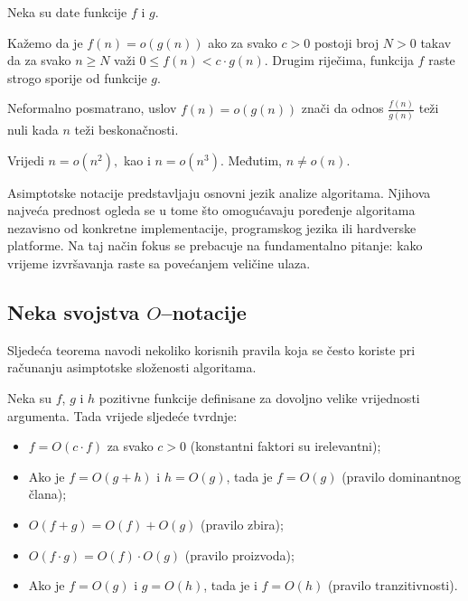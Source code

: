 \begin{definition}
	Neka su date funkcije $f$ i $g$.
	
	Kažemo da je $
	f(n)=o(g(n))$ ako za svako $c>0$ postoji broj $N>0$ takav da za svako $n\geq N$ važi $0\leq f(n)<c \cdot g(n).$ Drugim riječima, funkcija $f$ raste strogo sporije od funkcije $g$.
\end{definition}

Neformalno posmatrano, uslov $f(n)=o(g(n))
$ znači da odnos $
\frac{f(n)}{g(n)} $ teži nuli kada $n$ teži beskonačnosti.

\begin{example}
	Vrijedi $
	n=o(n^2),
	$ kao i 	$
	n=o(n^3).
	$ 	Međutim, 	$
	n\neq o(n).
	$
\end{example}

Asimptotske notacije predstavljaju osnovni jezik analize algoritama. Njihova najveća prednost ogleda se u tome što omogućavaju poređenje algoritama nezavisno od konkretne implementacije, programskog jezika ili hardverske platforme. Na taj način fokus se prebacuje na fundamentalno pitanje: kako vrijeme izvršavanja raste sa povećanjem veličine ulaza.


\subsection{Neka svojstva $O$--notacije}

Sljedeća teorema navodi nekoliko korisnih pravila koja se često koriste pri računanju asimptotske složenosti algoritama.

\begin{theorem}
	Neka su $f$, $g$ i $h$ pozitivne funkcije definisane za dovoljno velike vrijednosti argumenta. Tada vrijede sljedeće tvrdnje:
	
	\begin{itemize}
		\item $f = O(c \cdot f)$ za svako $c > 0$ \hfill (konstantni faktori su irelevantni);
		
		
		\item Ako je $f = O(g+h)$ i $h = O(g)$, tada je $f = O(g)$ \hfill (pravilo dominantnog člana);
		
		\item $O(f+g)=O(f)+O(g)$ \hfill (pravilo zbira);
		
		\item $O(f\cdot g)=O(f)\cdot O(g)$ \hfill (pravilo proizvoda);
		
		\item Ako je $f=O(g)$ i $g=O(h)$, tada je i $f=O(h)$ \hfill (pravilo tranzitivnosti).
		
		
	\end{itemize}
\end{theorem}

